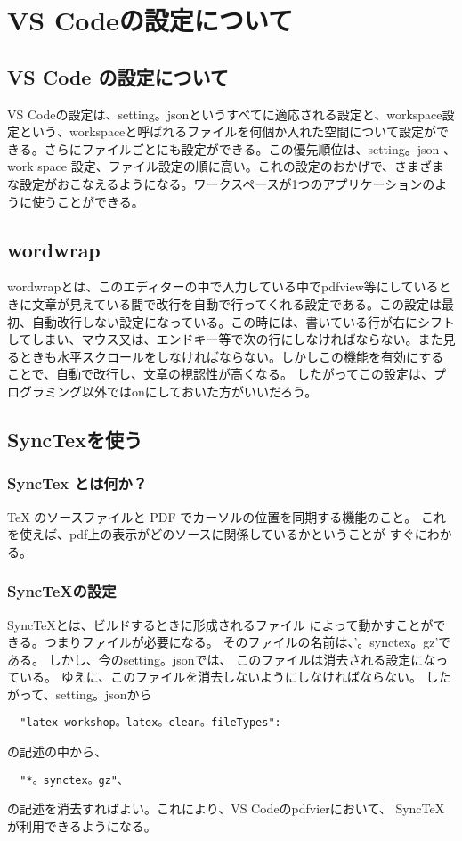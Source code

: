 \documentclass{ltjsarticle}
\begin{document}
\section{VS Codeの設定について}
\subsection{VS Code の設定について}
VS Codeの設定は、setting。jsonというすべてに適応される設定と、workspace設定という、workspaceと呼ばれるファイルを何個か入れた空間について設定ができる。さらにファイルごとにも設定ができる。この優先順位は、setting。json 、work space 設定、ファイル設定の順に高い。これの設定のおかげで、さまざまな設定がおこなえるようになる。ワークスペースが1つのアプリケーションのように使うことができる。
\subsection{wordwrap}
wordwrapとは、このエディターの中で入力している中でpdfview等にしているときに文章が見えている間で改行を自動で行ってくれる設定である。この設定は最初、自動改行しない設定になっている。この時には、書いている行が右にシフトしてしまい、マウス又は、エンドキー等で次の行にしなければならない。また見るときも水平スクロールをしなければならない。しかしこの機能を有効にすることで、自動で改行し、文章の視認性が高くなる。
したがってこの設定は、プログラミング以外ではonにしておいた方がいいだろう。
\subsection{SyncTexを使う}
\subsubsection*{SyncTex とは何か？}
TeX のソースファイルと PDF でカーソルの位置を同期する機能のこと。
これを使えば、pdf上の表示がどのソースに関係しているかということが
すぐにわかる。
\subsubsection*{SyncTeXの設定}
SyncTeXとは、ビルドするときに形成されるファイル
によって動かすことができる。つまりファイルが必要になる。
そのファイルの名前は、'。synctex。gz'である。
しかし、今のsetting。jsonでは、
このファイルは消去される設定になっている。
ゆえに、このファイルを消去しないようにしなければならない。
したがって、setting。jsonから
\begin{verbatim}
  "latex-workshop。latex。clean。fileTypes":
\end{verbatim}
の記述の中から、
\begin{verbatim}
  "*。synctex。gz"、
\end{verbatim}
の記述を消去すればよい。これにより、VS Codeのpdfvierにおいて、
SyncTeXが利用できるようになる。
\end{document}
